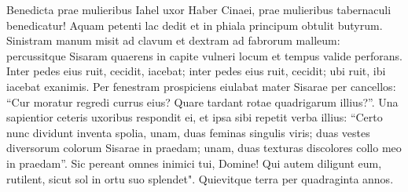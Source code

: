 \begin{biblechapter}
\verse Benedicta prae mulieribus Iahel uxor Haber Cinaei, prae mulieribus tabernaculi benedicatur! 
\verse Aquam petenti lac dedit et in phiala principum obtulit butyrum. 
\verse Sinistram manum misit ad clavum et dextram ad fabrorum malleum: percussitque Sisaram quaerens in capite vulneri locum et tempus valide perforans. 
\verse Inter pedes eius ruit, cecidit, iacebat; inter pedes eius ruit, cecidit; ubi ruit, ibi iacebat exanimis. 
\verse Per fenestram prospiciens eiulabat mater Sisarae per cancellos: “Cur moratur regredi currus eius? Quare tardant rotae quadrigarum illius?”. 
\verse Una sapientior ceteris uxoribus respondit ei, et ipsa sibi repetit verba illius: 
\verse “Certo nunc dividunt inventa spolia, unam, duas feminas singulis viris; duas vestes diversorum colorum Sisarae in praedam; unam, duas texturas discolores collo meo in praedam”. 
\verse Sic pereant omnes inimici tui, Domine! Qui autem diligunt eum, rutilent, sicut sol in ortu suo splendet". 
\verse Quievitque terra per quadraginta annos. 
\end{biblechapter}

